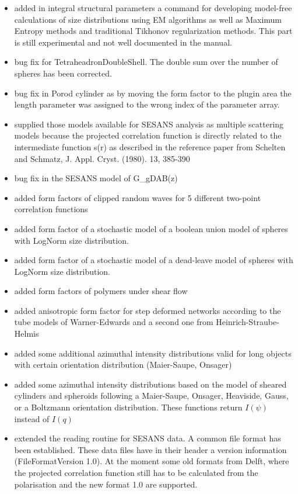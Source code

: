 \begin{description}
\begin{itemize}
    \item added in integral structural parameters a command for developing model-free calculations of size distributions using EM algorithms as well as Maximum Entropy methods and traditional Tikhonov regularization methods. This part is still experimental and not well documented in the manual.
    \item bug fix for TetraheadronDoubleShell. The double sum over the number of spheres has been corrected.
    \item bug fix in Porod cylinder as by moving the form factor to the plugin area the length parameter was assigned to the wrong index of the parameter array.
    \item supplied those models available for SESANS analysis as multiple scattering models because the projected correlation function is directly related to the intermediate function s(r) as described in the reference paper from Schelten and Schmatz, J. Appl. Cryst. (1980). 13, 385-390
    \item bug fix in the SESANS model of G\_gDAB(z)
    \item added form factors of clipped random waves for 5 different two-point correlation functions
    \item added form factor of a stochastic model of a boolean union model of spheres with LogNorm size distribution.
    \item added form factor of a stochastic model of a dead-leave model of spheres with LogNorm size distribution.
    \item added form factors of polymers under shear flow
    \item added anisotropic form factor for step deformed networks according to the tube models of Warner-Edwards and a second one from Heinrich-Straube-Helmis
     \item added some additional azimuthal intensity distributions valid for long objects with certain orientation distribution (Maier-Saupe, Onsager)
     \item added some azimuthal intensity distributions based on the model of sheared cylinders and spheroids following a Maier-Saupe, Onsager, Heaviside, Gauss, or a Boltzmann orientation distribution. These functions return $I(\psi)$ instead of $I(q)$
     \item extended the reading routine for SESANS data. A common file format has been established. These data files have in their header a version information (FileFormatVersion 1.0). At the moment some old formats from Delft, where the projected correlation function still has to be calculated from the polarisation and the new format 1.0 are supported.

\end{itemize}
\end{description}
